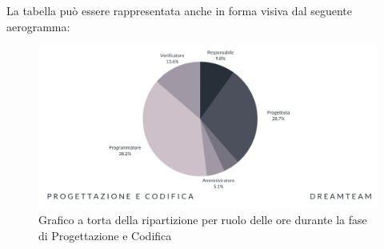 La tabella può essere rappresentata anche in forma visiva dal seguente aerogramma:
\begin{figure}[H]
\centering
\includegraphics[scale=0.65]{Sezioni/SezioniPreventivo/grafici/Progettazione_costi.png}
\caption{Grafico a torta della ripartizione per ruolo delle ore durante la fase di Progettazione e Codifica}
\end{figure}



